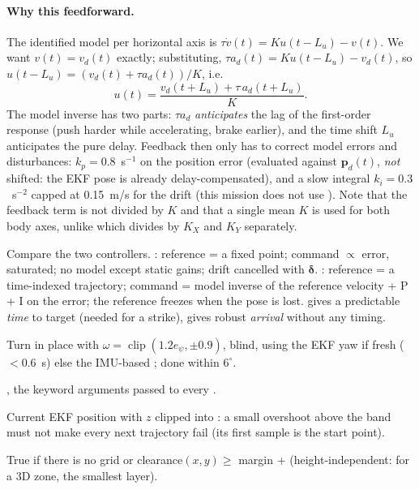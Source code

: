 \paragraph{Why this feedforward.} The identified model per horizontal axis is
$\tau \dot v(t) = K u(t - L_u) - v(t)$. We want $v(t) = v_d(t)$ exactly; substituting,
$\tau a_d(t) = K u(t-L_u) - v_d(t)$, so $u(t - L_u) = (v_d(t) + \tau a_d(t))/K$, i.e.
$$ u(t) = \frac{v_d(t + L_u) + \tau\,a_d(t + L_u)}{K}. $$
The model inverse has two parts: $\tau a_d$ \emph{anticipates} the lag of the first-order response (push harder
while accelerating, brake earlier), and the time shift $L_u$ anticipates the pure delay. Feedback then only has to
correct model errors and disturbances: $k_p = 0.8$~s$^{-1}$ on the position error (evaluated against $\mathbf p_d(t)$,
\emph{not} shifted: the EKF pose is already delay-compensated), and a slow integral $k_i = 0.3$~s$^{-2}$ capped at
0.15~m/s for the drift (this mission does not use ). Note that the feedback term is not divided
by $K$ and that a single mean $K$ is used for both body axes, unlike  which divides by $K_X$ and $K_Y$
separately.

\begin{keypoint}
Compare the two controllers. : reference = a fixed point; command $\propto$ error, saturated; no
model except static gains; drift cancelled with $\boldsymbol\delta$. : reference = a time-indexed
trajectory; command = model inverse of the reference velocity + P + I on the error; the reference freezes when the
pose is lost.  gives a predictable \emph{time} to target (needed for a strike),  gives
robust \emph{arrival} without any timing.
\end{keypoint}

Turn in place with $\omega = \operatorname{clip}(1.2 e_\psi, \pm 0.9)$, blind, using the EKF yaw if fresh
($<0.6$~s) else the IMU-based ; done within $6^\circ$.

, the keyword arguments passed to every .

Current EKF position with $z$ clipped into : a small overshoot above the band must not make every
next trajectory fail  (its first sample is the start point).

True if there is no grid or clearance$(x,y) \ge$ margin +  (height-independent: for a 3D zone, the
smallest layer).


